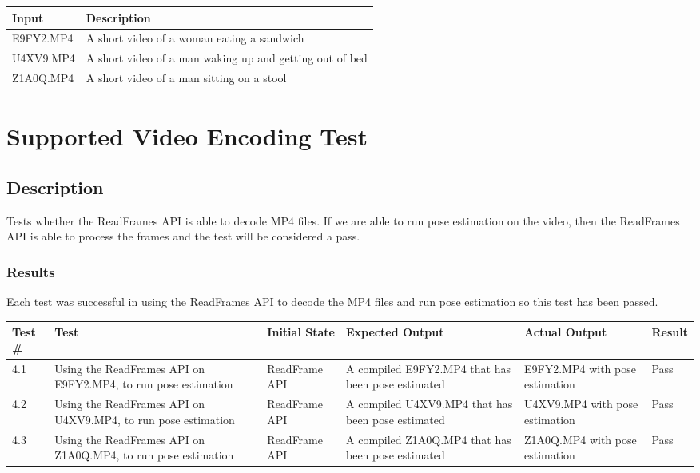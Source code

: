 \documentclass{scrreprt}
\begin{document}
\begin{table}[H]
        \centering
        \begin{tabular}{p{3cm}p{6cm}}
                \hline\hline
                Input & Description\\
                \hline\hline
                E9FY2.MP4  &  A short video of a woman eating a sandwich\\
                \hline
                U4XV9.MP4  &  A short video of a man waking up and getting out of bed\\
                \hline
                Z1A0Q.MP4 & A short video of a man sitting on a stool\\
                \hline
        \end{tabular}
\end{table}

\section{Supported Video Encoding Test}

\subsection{Description}

Tests whether the ReadFrames API is able to decode MP4 files. If we are able to run pose estimation on the video, then the ReadFrames API is able to process the frames and the test will be considered a pass.

\subsubsection{Results}

Each test was successful in using the ReadFrames API to decode the MP4 files and run pose estimation so this test has been passed.

\begin{table}[H]
        \centering
        \begin{tabular}[t]{||p{0.75cm}|p{4cm}|p{2.5cm}|p{3cm}|p{2.5cm}|p{0.75cm}||}
                \hline
                \textbf Test \# & \textbf Test & \textbf Initial State & \textbf Expected Output & \textbf Actual Output & \textbf Result\\
                \hline\hline
                4.1 & Using the ReadFrames API on E9FY2.MP4, to run pose estimation & ReadFrame API & A compiled E9FY2.MP4 that has been pose estimated & E9FY2.MP4 with pose estimation & Pass\\
                \hline
                4.2 & Using the ReadFrames API on U4XV9.MP4, to run pose estimation & ReadFrame API & A compiled U4XV9.MP4 that has been pose estimated & U4XV9.MP4 with pose estimation & Pass\\
                \hline
                4.3 & Using the ReadFrames API on Z1A0Q.MP4, to run pose estimation & ReadFrame API & A compiled Z1A0Q.MP4 that has been pose estimated & Z1A0Q.MP4 with pose estimation & Pass\\
                \hline
        \end{tabular}
\end{table}
\end{document}
